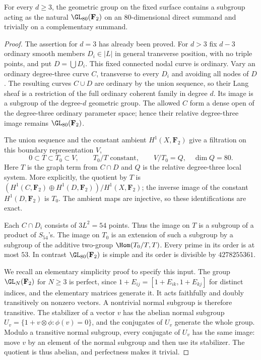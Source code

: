 \begin{lemma}
\label{lem:product-degree-three-block}
For every $d\ge3$, the geometric group on the fixed surface
contains a subgroup acting as the natural
$\GL_{80}(\mathbf F_2)$ on an $80$-dimensional direct summand
and trivially on a complementary summand.
\end{lemma}

\begin{proof}
The assertion for $d=3$ has already been proved.  For $d>3$ fix
$d-3$ ordinary smooth members $D_i\in|L|$ in general transverse
position, with no triple points, and put $D=\bigcup D_i$.
This fixed connected nodal curve is ordinary.
Vary an ordinary degree-three curve $C$, transverse to every
$D_i$ and avoiding all nodes of $D$.
The resulting curves $C\cup D$ are ordinary by the union sequence,
so their Lang sheaf is a restriction of the full ordinary
coherent family in degree $d$.  Its image is a subgroup of the
degree-$d$ geometric group.  The allowed $C$ form a dense open
of the degree-three ordinary parameter space; hence their
relative degree-three image remains $\GL_{80}(\mathbf F_2)$.

The union sequence and the constant ambient
$H^1(X,\mathbf F_2)$ give a filtration on this boundary
representation $V$,
\[
 0\subset T\subset T_0\subset V,
 \qquad T_0/T\text{ constant},\qquad V/T_0=Q,
 \quad\dim Q=80.
\]
Here $T$ is the graph term from $C\cap D$ and $Q$ is the relative
degree-three local system.  More explicitly, the quotient by
$T$ is
$(H^1(C,\mathbf F_2)\oplus H^1(D,\mathbf F_2))/H^1(X,\mathbf F_2)$;
the inverse image of the constant $H^1(D,\mathbf F_2)$ is $T_0$.
The ambient maps are injective, so these identifications are exact.

Each $C\cap D_i$ consists of $3L^2=54$ points.
Thus the image on $T$ is a subgroup of a product of $S_{54}$'s.
The image on $T_0$ is an extension of such a subgroup by a
subgroup of the additive two-group
$\Hom(T_0/T,T)$.  Every prime in its order is at most $53$.
In contrast $\GL_{80}(\mathbf F_2)$ is simple and its order is
divisible by $4278255361$.

We recall an elementary simplicity proof to specify this input.
The group $\GL_N(\mathbf F_2)$ for $N\ge3$ is perfect, since
$1+E_{ij}=[1+E_{ik},1+E_{kj}]$ for distinct indices, and the
elementary matrices generate it.  It acts faithfully and doubly
transitively on nonzero vectors.  A nontrivial normal subgroup
is therefore transitive.  The stabilizer of a vector $v$ has
the abelian normal subgroup
$U_v=\{1+v\otimes\phi:\phi(v)=0\}$, and the conjugates of $U_v$
generate the whole group.  Modulo a transitive normal subgroup,
every conjugate of $U_v$ has the same image: move $v$ by an
element of the normal subgroup and then use its stabilizer.
The quotient is thus abelian, and perfectness makes it trivial.


\end{proof}
